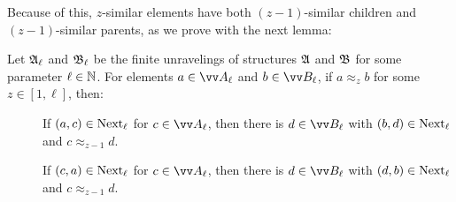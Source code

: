 Because of this, $z$-similar elements have both $(z-1)$-similar children and $(z-1)$-similar parents, as we prove with the next lemma:
\begin{lemma}\label{lem:approx-next}
  Let ${\mathfrak{A}}_{\ell}$ and ${\mathfrak{B}}_{\ell}$ be the finite unravelings of structures ${\mathfrak{A}}$ and ${\mathfrak{B}}$ for some parameter $\ell \in {\mathbb{N}}$.
  For elements $a \in \unraveldom{A}_{\ell}$ and $b \in \unraveldom{B}_{\ell}$, if $a \approx_{z} b$ for some $z \in [1,\ell]$, then:
  \begin{description}
    \item[] If $(a, c) \in \mathrm{Next}_{\ell}$ for $c \in \unraveldom{A}_{\ell}$, then there is $d \in \unraveldom{B}_{\ell}$ with $(b, d) \in \mathrm{Next}_{\ell}$ and $c \approx_{z-1} d$.
    \item[] If $(c, a) \in \mathrm{Next}_{\ell}$ for $c \in \unraveldom{A}_{\ell}$, then there is $d \in \unraveldom{B}_{\ell}$ with $(d, b) \in \mathrm{Next}_{\ell}$ and $c \approx_{z-1} d$.
  \end{description}
\end{lemma}
